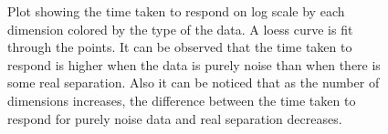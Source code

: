 \begin{figure}[hbtp]
   \centering
      \caption{Plot showing the time taken to respond on log scale by each dimension colored by the type of the data. A loess curve is fit through the points. It can be observed that the time taken to respond is higher when the data is purely noise than when there is some real separation. Also it can be noticed that as the number of dimensions increases, the difference between the time taken to respond for purely noise data and real separation decreases. }
       \label{time-taken}
\end{figure}


